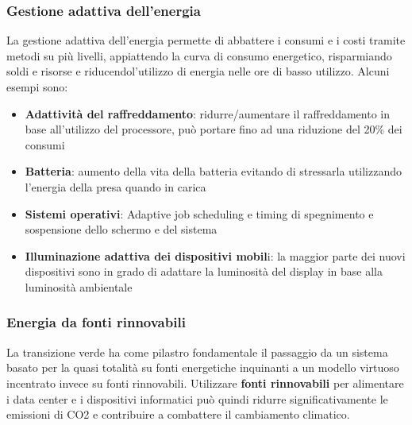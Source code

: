 \subsubsection{Gestione adattiva dell'energia}
La gestione adattiva dell'energia permette di abbattere i consumi e i costi tramite metodi su più livelli, appiattendo la curva di consumo energetico, risparmiando soldi e risorse e riducendol’utilizzo di energia nelle ore di basso utilizzo. Alcuni esempi sono:
\begin{itemize}
	\item \textbf{Adattività del raffreddamento}: ridurre/aumentare il raffreddamento in base all’utilizzo del processore, può portare fino ad una riduzione del 20\% dei consumi
	\item \textbf{Batteria}: aumento della vita della batteria evitando di stressarla utilizzando l’energia della presa quando in carica
	\item \textbf{Sistemi operativi}: Adaptive job scheduling e timing di spegnimento e sospensione dello schermo e del sistema
	\item \textbf{Illuminazione adattiva dei dispositivi mobil}i: la maggior parte dei nuovi dispositivi sono in grado di adattare la luminosità del display in base alla luminosità ambientale
\end{itemize}
\subsubsection{Energia da fonti rinnovabili}
La transizione verde ha come pilastro fondamentale il passaggio da un sistema basato per la quasi totalità su fonti energetiche inquinanti a un modello virtuoso incentrato invece su fonti rinnovabili. Utilizzare \textbf{fonti rinnovabili} per alimentare i data center e i dispositivi informatici può quindi ridurre significativamente le emissioni di CO2 e 
contribuire a combattere il cambiamento climatico.
